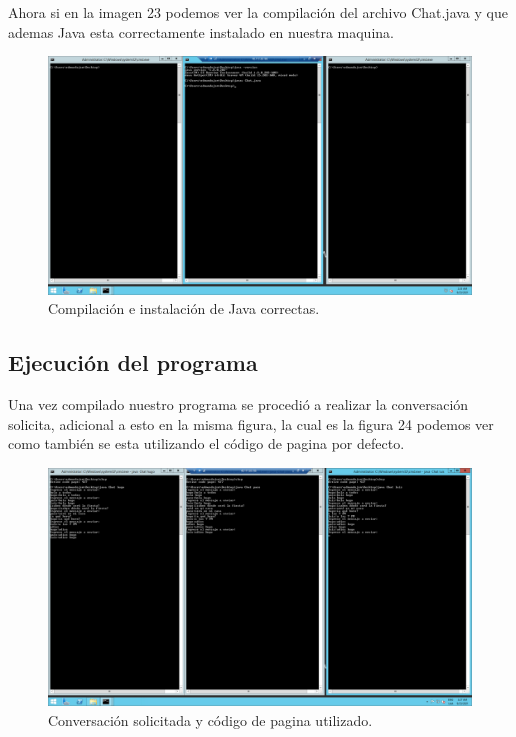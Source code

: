 \documentclass[11pt]{article}
\begin{document}
		Ahora si en la imagen 23 podemos ver la compilación del archivo Chat.java y que ademas Java esta correctamente instalado en nuestra maquina.
		\begin{figure}[H]
			\centering
			\includegraphics[scale=0.34]{resources/compiliacionyjavabien.png}
			\caption{Compilación e instalación de Java correctas. }\label{fig:picture}
		\end{figure}
		\newpage
		\subsection{Ejecución del programa}
		Una vez compilado nuestro programa se procedió a realizar la conversación solicita, adicional a esto en la misma figura, la cual es la figura 24 podemos ver como también se esta utilizando el código de pagina por defecto.
		\begin{figure}[H]
			\centering
			\includegraphics[scale=0.34]{resources/resultadofinal.png}
			\caption{Conversación solicitada y código de pagina utilizado. }\label{fig:picture}
		\end{figure}
\end{document}
